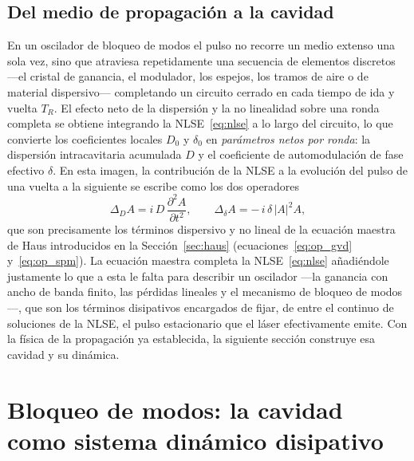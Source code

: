 \subsection{Del medio de propagación a la cavidad}

En un oscilador de bloqueo de modos el pulso no recorre un medio extenso una sola
vez, sino que atraviesa repetidamente una secuencia de elementos discretos —el
cristal de ganancia, el modulador, los espejos, los tramos de aire o de material
dispersivo— completando un circuito cerrado en cada tiempo de ida y vuelta $T_R$.
El efecto neto de la dispersión y la no linealidad sobre una ronda completa se
obtiene integrando la NLSE~\eqref{eq:nlse} a lo largo del circuito, lo que
convierte los coeficientes locales $D_0$ y $\delta_0$ en \emph{parámetros netos
por ronda}: la dispersión intracavitaria acumulada $D$ y el coeficiente de
automodulación de fase efectivo $\delta$. En esta imagen, la contribución de la
NLSE a la evolución del pulso de una vuelta a la siguiente se escribe como los dos
operadores
%
\begin{equation}
    \Delta_{D} A = i\,D\,\frac{\partial^2 A}{\partial t^2},
    \qquad
    \Delta_{\delta} A = -\,i\,\delta\,|A|^2 A ,
    \label{eq:nlse_cavidad}
\end{equation}
%
que son precisamente los términos dispersivo y no lineal de la ecuación maestra de
Haus introducidos en la Sección~\ref{sec:haus}
(ecuaciones~\eqref{eq:op_gvd} y~\eqref{eq:op_spm}). La ecuación
maestra completa la NLSE~\eqref{eq:nlse} añadiéndole justamente lo que a esta le
falta para describir un oscilador —la ganancia con ancho de banda finito, las
pérdidas lineales y el mecanismo de bloqueo de modos—, que son los términos
disipativos encargados de fijar, de entre el continuo de soluciones de la NLSE,
el pulso estacionario que el láser efectivamente emite. Con la física de la
propagación ya establecida, la siguiente sección construye esa cavidad y su
dinámica.


\section{Bloqueo de modos: la cavidad como sistema dinámico disipativo}
\label{sec:mode_locking}

